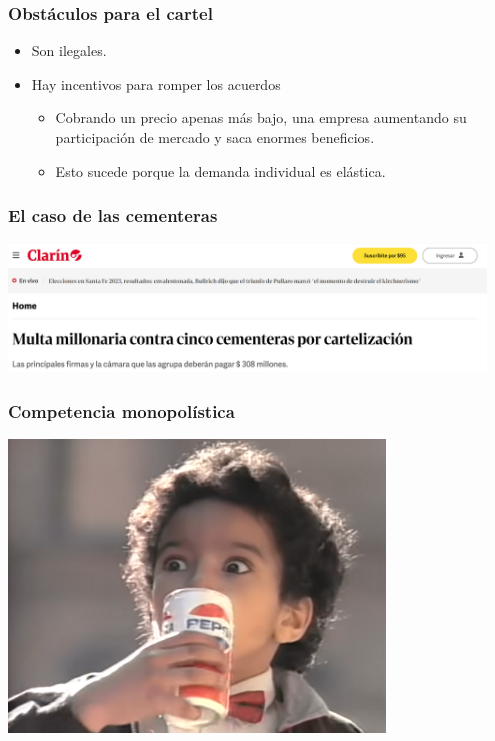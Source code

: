 \documentclass{beamer}
\begin{document}

\begin{frame}
\frametitle{Obstáculos para el cartel}
\begin{itemize}
    \item Son ilegales.\vspace{4mm}
    \item Hay incentivos para romper los acuerdos\vspace{2mm}
    \begin{itemize}
        \item Cobrando un precio apenas más bajo, una empresa aumentando su participación de mercado y saca enormes beneficios.\vspace{1mm}
        \item Esto sucede porque la demanda individual es elástica.
    \end{itemize}
\end{itemize}
\end{frame}

\begin{frame}
\frametitle{El caso de las cementeras}
\centering
\includegraphics[width=0.95\textwidth]{../Figures/Cartel.png}

\end{frame}

\begin{frame}
\frametitle{Competencia monopolística}
\begin{center}
  \href{https://www.youtube.com/watch?v=po0jY4WvCIc}{    \includegraphics[width=0.75\textwidth]{../Figures/Diferenciacion (1).png}}
\end{center}
\end{frame}
\end{document}
